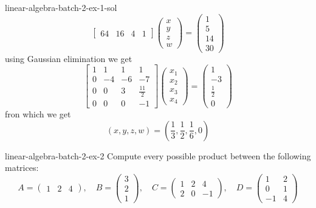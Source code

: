 \documentclass[preview]{standalone}
\begin{document}
\begin{snippetsolution}{linear-algebra-batch-2-ex-1-sol}{}
\[\begin{bmatrix}
            64 & 16 & 4 & 1
        \end{bmatrix}
        \begin{pmatrix}
            x \\
            y \\
            z \\
            w
        \end{pmatrix}
        = \begin{pmatrix}
            1 \\
            5 \\
            14 \\
            30
        \end{pmatrix}
    \]
    using Gaussian elimination we get
    \[
        \begin{bmatrix}
            1 & 1 & 1 & 1 \\
            0 & -4 & -6 & -7 \\
            0 & 0 & 3 & \frac{11}{2} \\
            0 & 0 & 0 & -1
        \end{bmatrix}
        \begin{pmatrix}
            x_1 \\
            x_2 \\
            x_3 \\
            x_4
        \end{pmatrix}
        = \begin{pmatrix}
            1 \\
            -3 \\
            \frac{1}{2} \\
            0
        \end{pmatrix}
    \]
    fron which we get
    \[
        (x,y,z,w) = \left(
            \frac{1}{3}, \frac{1}{2}, \frac{1}{6}, 0
        \right)
    \]
\end{snippetsolution}

\begin{snippetexercise}{linear-algebra-batch-2-ex-2}{}
    Compute every possible product between the following matrices:
    \[
        A = \begin{pmatrix}
            1 & 2 & 4
        \end{pmatrix},
        \quad
        B = \begin{pmatrix}
            3 \\ 2 \\ 1
        \end{pmatrix},
        \quad
        C = \begin{pmatrix}
            1 & 2 & 4 \\
            2 & 0 & -1
        \end{pmatrix},
        \quad
        D = \begin{pmatrix}
            1 & 2 \\
            0 & 1 \\
            -1 & 4
        \end{pmatrix}
    \]
\end{snippetexercise}
\end{document}

